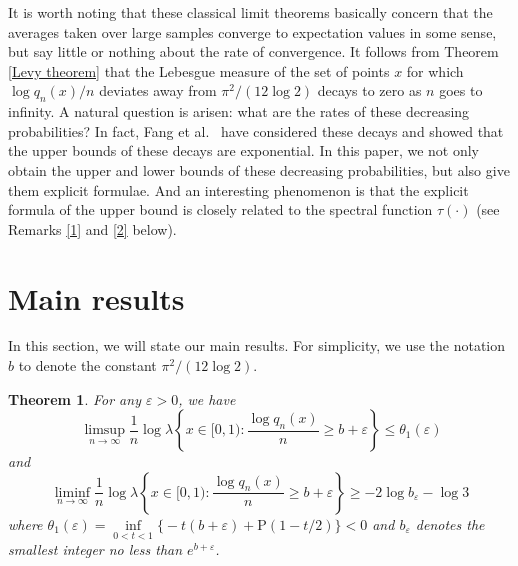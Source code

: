 \documentclass[reqno]{amsart}
\newtheorem{theorem}{Theorem}[section]
\theoremstyle{definition}
\numberwithin{equation}{section}
\begin{document}
It is worth noting that these classical limit theorems basically concern that the averages taken over large samples converge to expectation values in some sense, but say little or nothing about the rate of convergence.
It follows from Theorem \ref{Levy theorem} that the Lebesgue measure of the set of points $x$ for which $\log q_n(x)/n$ deviates away from $\pi^2/(12\log2)$ decays to zero as $n$ goes to infinity.
A natural question is arisen: what are the rates of these decreasing probabilities?
In fact,
Fang et al.~\cite{lesFWSL15} have considered these decays and showed that the upper bounds of these decays are exponential.
In this paper, we not only obtain the upper and lower bounds of these decreasing probabilities, but also give them explicit formulae. And an interesting phenomenon is that the explicit formula of the upper bound is closely related to the spectral function $\tau(\cdot)$ (see Remarks \ref{1} and \ref{2} below).

\section{Main results}
In this section, we will state our main results. For simplicity, we use the notation $b$ to denote the constant $\pi^2/(12\log2)$.

\begin{theorem}\label{dayu}
For any $\varepsilon >0$, we have
\begin{equation*}\
\limsup_{n \to \infty} \frac{1}{n}\log \lambda\left\{x\in [0,1):\frac{\log q_n(x)}{n} \geq b + \varepsilon\right\} \leq \theta_1(\varepsilon)
\end{equation*}
and
\begin{equation*}
\liminf_{n \to \infty} \frac{1}{n}\log \lambda\left\{x\in [0,1):\frac{\log q_n(x)}{n} \geq b + \varepsilon\right\} \geq -2\log b_\varepsilon - \log 3
\end{equation*}
where $\theta_1(\varepsilon) = \inf\limits_{0< t < 1} \big\{-t(b + \varepsilon) + \mathrm{P}(1-t/2)\big\}< 0$ and $b_\varepsilon$ denotes the smallest integer no less than $e^{b+\varepsilon}$.
\end{theorem}
\end{document}
